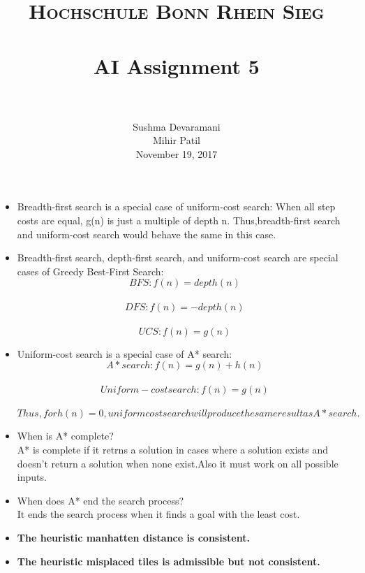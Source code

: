 \documentclass[paper=a4, fontsize=11pt]{scrartcl}
\title{
        \usefont{OT1}{bch}{b}{n}
        \normalfont \normalsize \textsc{Hochschule Bonn Rhein Sieg} \\ 
        \horrule{0.5pt} \\[0.4cm]
        \huge AI Assignment 5\\
        \horrule{2pt} \\[0.5cm]
}
\author{
        \normalfont                                 \normalsize
        Sushma Devaramani\\
        Mihir Patil\\  
        November 19, 2017
}
\date{}
\numberwithin{equation}{section}        %
\numberwithin{figure}{section}          %
\numberwithin{table}{section}               %
\begin{document}
\begin{itemize}
\item Breadth-first search is a special case of uniform-cost search: When all step costs are equal, g(n) is just a multiple of depth n. Thus,breadth-first search and uniform-cost search would behave the same in this case.\\
\item Breadth-first search, depth-first search, and uniform-cost search are special cases of Greedy Best-First Search:$$BFS: f(n) = depth(n)$$\\$$DFS: f(n) = -depth(n)$$\\$$UCS: f(n) = g(n)$$
\item Uniform-cost search is a special case of A* search:\\
$$A* search: f(n) = g(n) + h(n)$$\\
$$Uniform-cost search: f(n) = g(n)$$\\
$$Thus, for h(n) = 0, uniform cost search will produce the same result as A* search.$$
\end{itemize}

\begin{itemize}
\item When is A* complete?\\
A* is complete if it retrns a solution in cases where a solution exists and doesn't return a solution when none exist.Also it must work on all possible inputs.
\item When does A* end the search process?\\
It ends the search process when it finds a goal with the least cost.
\end{itemize}

\begin{itemize}
	\item \textbf{The heuristic manhatten distance is consistent.}\\
	\item \textbf{The heuristic misplaced tiles is admissible but not consistent.}
\end{itemize}
\end{document}
